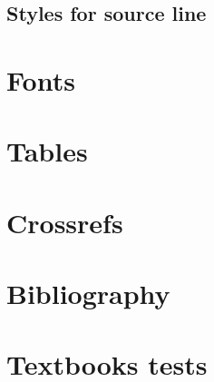 \documentclass[biblatex
	      ,output=short
	      ,nonflat
	      ,modfonts
	      ]{langsci/langscibook}
\begin{document}
 

\subsection{Styles for source line}

\section{Fonts}
% 

\section{Tables}\label{sec:tables}

\section{Crossrefs}

\section{Bibliography}
 
%  

% 
%  
 
\section{Textbooks tests}
 
 



\end{document}
